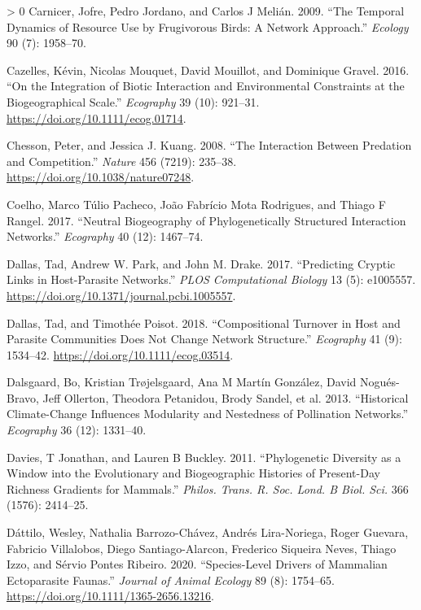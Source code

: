 \documentclass[11pt]{article}
\newlength{\cslhangindent}
\newenvironment{CSLReferences}[3] %
 {%
  \setlength{\parindent}{0pt}
  \ifodd #1 \everypar{\setlength{\hangindent}{\cslhangindent}}\ignorespaces\fi
  \ifnum #2 > 0
  \setlength{\parskip}{#2\baselineskip}
  \fi
 }%
 {}
\begin{document}
\begin{CSLReferences}{1}{0}
\leavevmode\hypertarget{ref-Carnicer2009TemDyn}{}%
Carnicer, Jofre, Pedro Jordano, and Carlos J Melián. 2009. {``The
Temporal Dynamics of Resource Use by Frugivorous Birds: A Network
Approach.''} \emph{Ecology} 90 (7): 1958--70.

\leavevmode\hypertarget{ref-Cazelles2016IntBio}{}%
Cazelles, Kévin, Nicolas Mouquet, David Mouillot, and Dominique Gravel.
2016. {``On the Integration of Biotic Interaction and Environmental
Constraints at the Biogeographical Scale.''} \emph{Ecography} 39 (10):
921--31. \url{https://doi.org/10.1111/ecog.01714}.

\leavevmode\hypertarget{ref-Chesson2008IntPre}{}%
Chesson, Peter, and Jessica J. Kuang. 2008. {``The Interaction Between
Predation and Competition.''} \emph{Nature} 456 (7219): 235--38.
\url{https://doi.org/10.1038/nature07248}.

\leavevmode\hypertarget{ref-Coelho2017NeuBio}{}%
Coelho, Marco Túlio Pacheco, João Fabrício Mota Rodrigues, and Thiago F
Rangel. 2017. {``Neutral Biogeography of Phylogenetically Structured
Interaction Networks.''} \emph{Ecography} 40 (12): 1467--74.

\leavevmode\hypertarget{ref-Dallas2017PreCry}{}%
Dallas, Tad, Andrew W. Park, and John M. Drake. 2017. {``Predicting
Cryptic Links in Host-Parasite Networks.''} \emph{PLOS Computational
Biology} 13 (5): e1005557.
\url{https://doi.org/10.1371/journal.pcbi.1005557}.

\leavevmode\hypertarget{ref-Dallas2018ComTur}{}%
Dallas, Tad, and Timothée Poisot. 2018. {``Compositional Turnover in
Host and Parasite Communities Does Not Change Network Structure.''}
\emph{Ecography} 41 (9): 1534--42.
\url{https://doi.org/10.1111/ecog.03514}.

\leavevmode\hypertarget{ref-Dalsgaard2013HisCli}{}%
Dalsgaard, Bo, Kristian Trøjelsgaard, Ana M Martín González, David
Nogués-Bravo, Jeff Ollerton, Theodora Petanidou, Brody Sandel, et al.
2013. {``Historical Climate-Change Influences Modularity and Nestedness
of Pollination Networks.''} \emph{Ecography} 36 (12): 1331--40.

\leavevmode\hypertarget{ref-Davies2011PhyDiv}{}%
Davies, T Jonathan, and Lauren B Buckley. 2011. {``Phylogenetic
Diversity as a Window into the Evolutionary and Biogeographic Histories
of Present-Day Richness Gradients for Mammals.''} \emph{Philos. Trans.
R. Soc. Lond. B Biol. Sci.} 366 (1576): 2414--25.

\leavevmode\hypertarget{ref-Dattilo2020SpeDri}{}%
Dáttilo, Wesley, Nathalia Barrozo-Chávez, Andrés Lira-Noriega, Roger
Guevara, Fabricio Villalobos, Diego Santiago-Alarcon, Frederico Siqueira
Neves, Thiago Izzo, and Sérvio Pontes Ribeiro. 2020. {``Species-Level
Drivers of Mammalian Ectoparasite Faunas.''} \emph{Journal of Animal
Ecology} 89 (8): 1754--65.
\url{https://doi.org/10.1111/1365-2656.13216}.


\end{CSLReferences}
\end{document}
